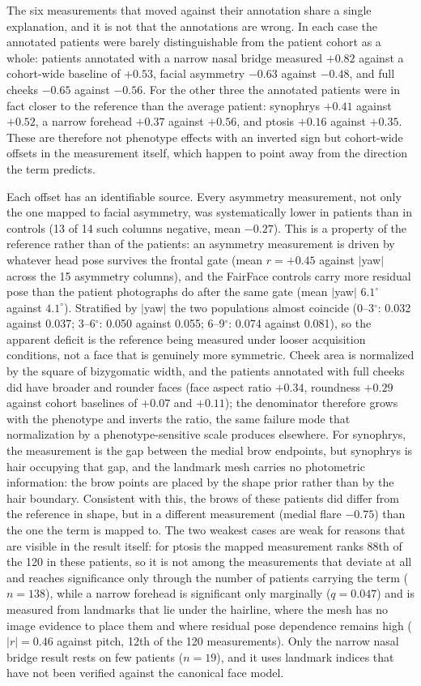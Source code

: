 The six measurements that moved against their annotation share a single
explanation, and it is not that the annotations are wrong. In each case the
annotated patients were barely distinguishable from the patient cohort as a whole:
patients annotated with a narrow nasal bridge measured $+0.82$ against a
cohort-wide baseline of $+0.53$, facial asymmetry $-0.63$ against $-0.48$, and full
cheeks $-0.65$ against $-0.56$. For the other three the annotated patients were in
fact closer to the reference than the average patient: synophrys $+0.41$ against
$+0.52$, a narrow forehead $+0.37$ against $+0.56$, and ptosis $+0.16$ against
$+0.35$. These are therefore not phenotype effects with an inverted sign but
cohort-wide offsets in the measurement itself, which happen to point away from the
direction the term predicts.

Each offset has an identifiable source. Every asymmetry measurement, not only the
one mapped to facial asymmetry, was systematically lower in patients than in
controls (13 of 14 such columns negative, mean $-0.27$). This is a property of the
reference rather than of the patients: an asymmetry measurement is driven by
whatever head pose survives the frontal gate (mean $r=+0.45$ against $|$yaw$|$
across the 15 asymmetry columns), and the FairFace controls carry more residual
pose than the patient photographs do after the same gate (mean $|$yaw$|$
$6.1^{\circ}$ against $4.1^{\circ}$). Stratified by $|$yaw$|$ the two populations
almost coincide (0--3$^{\circ}$: 0.032 against 0.037; 3--6$^{\circ}$: 0.050
against 0.055; 6--9$^{\circ}$: 0.074 against 0.081), so the apparent deficit is
the reference being measured under looser acquisition conditions, not a face that
is genuinely more symmetric. Cheek area is normalized by the square of bizygomatic width, and the
patients annotated with full cheeks did have broader and rounder faces
(face aspect ratio $+0.34$, roundness $+0.29$ against cohort baselines of $+0.07$
and $+0.11$); the denominator therefore grows with the phenotype and inverts the
ratio, the same failure mode that normalization by a phenotype-sensitive scale
produces elsewhere. For synophrys, the measurement is the gap between the medial
brow endpoints, but synophrys is hair occupying that gap, and the landmark mesh
carries no photometric information: the brow points are placed by the shape prior
rather than by the hair boundary. Consistent with this, the brows of these patients
did differ from the reference in shape, but in a different measurement
(medial flare $-0.75$) than the one the term is mapped to. The two weakest cases
are weak for reasons that are visible in the result itself: for ptosis the mapped
measurement ranks 88th of the 120 in these patients, so it is not among the
measurements that deviate at all and reaches significance only through the number
of patients carrying the term ($n=138$), while a narrow forehead is significant
only marginally ($q=0.047$) and is measured from landmarks that lie under the
hairline, where the mesh has no image evidence to place them and where residual
pose dependence remains high ($|r|=0.46$ against pitch, 12th of the 120
measurements). Only the
narrow nasal bridge result rests on few patients ($n=19$), and it uses landmark
indices that have not been verified against the canonical face model.

